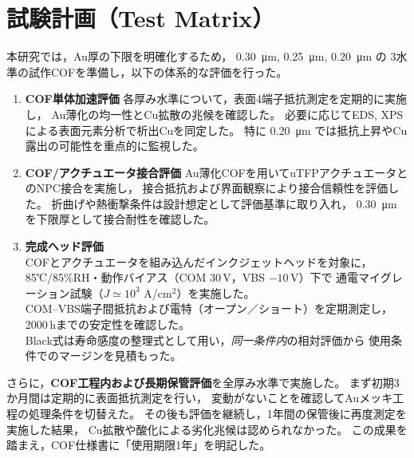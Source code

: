 \documentclass[conference]{IEEEtran}
\begin{document}
\section{試験計画（Test Matrix）}
本研究では，Au厚の下限を明確化するため，
\SI{0.30}{\micro\meter}, \SI{0.25}{\micro\meter}, \SI{0.20}{\micro\meter} の
3水準の試作COFを準備し，以下の体系的な評価を行った。

\begin{enumerate}
  \item \textbf{COF単体加速評価}  
        各厚み水準について，表面4端子抵抗測定を定期的に実施し，
        Au薄化の均一性とCu拡散の兆候を確認した。  
        必要に応じてEDS, XPSによる表面元素分析で析出Cuを同定した。  
        特に \SI{0.20}{\micro\meter} では抵抗上昇やCu露出の可能性を重点的に監視した。
  \item \textbf{COF/アクチュエータ接合評価}  
        Au薄化COFを用いてuTFPアクチュエータとのNPC接合を実施し，
        接合抵抗および界面観察により接合信頼性を評価した。  
        折曲げや熱衝撃条件は設計想定として評価基準に取り入れ，
        \SI{0.30}{\micro\meter} を下限厚として接合耐性を確認した。
  \item \textbf{完成ヘッド評価} \\
        COFとアクチュエータを組み込んだインクジェットヘッドを対象に，
        85℃/85\%RH・動作バイアス（COM 30\,V，VBS $-10$\,V）下で
        通電マイグレーション試験（$J \simeq 10^{3}$ A/cm$^{2}$）を実施した。\\
        COM--VBS端子間抵抗および電特（オープン／ショート）を定期測定し，
        2000\,hまでの安定性を確認した。\\
        Black式は寿命感度の整理式として用い，\emph{同一条件内}の相対評価から
        使用条件でのマージンを見積もった。
\end{enumerate}

さらに，\textbf{COF工程内および長期保管評価}を全厚み水準で実施した。  
まず初期3か月間は定期的に表面抵抗測定を行い，
変動がないことを確認してAuメッキ工程の処理条件を切替えた。  
その後も評価を継続し，1年間の保管後に再度測定を実施した結果，
Cu拡散や酸化による劣化兆候は認められなかった。  
この成果を踏まえ，COF仕様書に「使用期限1年」を明記した。
\end{document}
